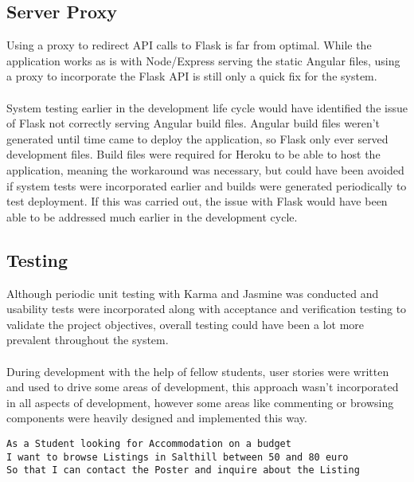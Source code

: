 \subsection{Server Proxy}
Using a proxy to redirect API calls to Flask is far from optimal. While the application works as is with Node/Express serving the static Angular files, using a proxy to incorporate the Flask API is still only a quick fix for the system. 

\paragraph{}
System testing earlier in the development life cycle would have identified the issue of Flask not correctly serving Angular build files. Angular build files weren't generated until time came to deploy the application, so Flask only ever served development files. Build files were required for Heroku to be able to host the application, meaning the workaround was necessary, but could have been avoided if system tests were incorporated earlier and builds were generated periodically to test deployment. If this was carried out, the issue with Flask would have been able to be addressed much earlier in the development cycle.

\subsection{Testing}
Although periodic unit testing with Karma and Jasmine was conducted and usability tests were incorporated along with acceptance and verification testing to validate the project objectives, overall testing could have been a lot more prevalent throughout the system.

\paragraph{}
During development with the help of fellow students, user stories were written and used to drive some areas 
of development, this approach wasn't incorporated in all aspects of development, however some areas like commenting or browsing components were heavily designed and implemented this way. \newline

\begin{lstlisting}[caption=User Story used as a base for browse functionality]
As a Student looking for Accommodation on a budget
I want to browse Listings in Salthill between 50 and 80 euro
So that I can contact the Poster and inquire about the Listing
\end{lstlisting}

